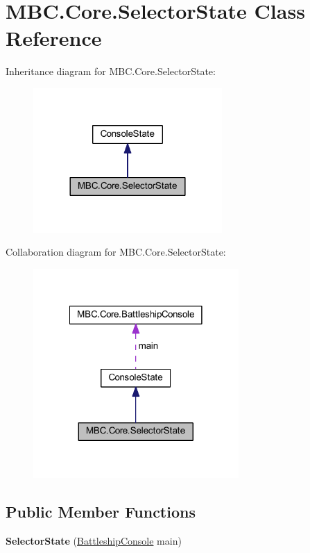\hypertarget{class_m_b_c_1_1_core_1_1_selector_state}{\section{M\-B\-C.\-Core.\-Selector\-State Class Reference}
\label{class_m_b_c_1_1_core_1_1_selector_state}
}


Inheritance diagram for M\-B\-C.\-Core.\-Selector\-State\-:\nopagebreak
\begin{figure}[H]
\begin{center}
\leavevmode
\includegraphics[width=204pt]{class_m_b_c_1_1_core_1_1_selector_state__inherit__graph}
\end{center}
\end{figure}


Collaboration diagram for M\-B\-C.\-Core.\-Selector\-State\-:\nopagebreak
\begin{figure}[H]
\begin{center}
\leavevmode
\includegraphics[width=222pt]{class_m_b_c_1_1_core_1_1_selector_state__coll__graph}
\end{center}
\end{figure}
\subsection*{Public Member Functions}
\begin{DoxyCompactItemize}
\item 
\hypertarget{class_m_b_c_1_1_core_1_1_selector_state_ac85362291ef7f49ad2d54441d0b78481}{{\bfseries Selector\-State} (\hyperlink{class_m_b_c_1_1_core_1_1_battleship_console}{Battleship\-Console} main)}\label{class_m_b_c_1_1_core_1_1_selector_state_ac85362291ef7f49ad2d54441d0b78481}

\end{DoxyCompactItemize}
